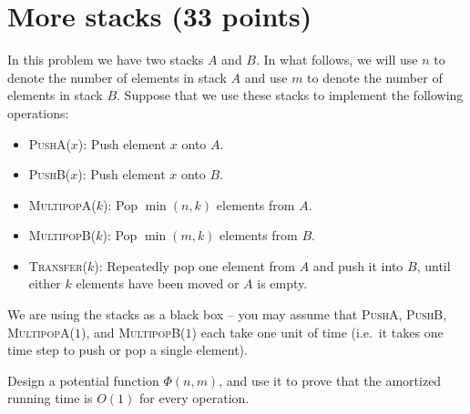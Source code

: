 \documentclass{article}
\begin{document}
\section{More stacks (33 points)}
In this problem we have two stacks $A$ and $B$.  In what follows, we will use $n$ to denote the number of elements in stack $A$ and use $m$ to denote the number of elements in stack $B$.  Suppose that  we use these stacks to implement the following operations: 
\begin{itemize}
	\item \textsc{PushA($x$)}: Push element $x$ onto $A$.
	\item \textsc{PushB($x$)}: Push element $x$ onto $B$.
	\item \textsc{MultipopA($k$)}: Pop $\min(n,k)$ elements from $A$.
	\item \textsc{MultipopB($k$)}: Pop $\min(m,k)$ elements from $B$.
	\item \textsc{Transfer($k$)}: Repeatedly pop one element from $A$ and push it into $B$, until either $k$ elements have been moved or $A$ is empty.
\end{itemize}

We are using the stacks as a black box -- you may assume that \textsc{PushA}, \textsc{PushB}, \textsc{MultipopA($1$)}, and \textsc{MultipopB($1$)} each take one unit of time (i.e.~it takes one time step to push or pop a single element).

Design a potential function $\Phi(n,m)$, and use it to prove that the amortized running time is $O(1)$ for every operation.
\end{document}
